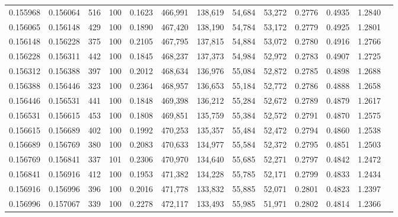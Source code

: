 \begin{tabular}{rrrrrrrrrrrrr}
0.155968 & 0.156064 &   516 & 100 &                                     0.1623 & 466,991 & 138,619 &  54,684 &  53,272 & 0.2776 & 0.4935 & 1.2840 \\
0.156065 & 0.156148 &   429 & 100 &                                     0.1890 & 467,420 & 138,190 &  54,784 &  53,172 & 0.2779 & 0.4925 & 1.2801 \\
0.156148 & 0.156228 &   375 & 100 &                                     0.2105 & 467,795 & 137,815 &  54,884 &  53,072 & 0.2780 & 0.4916 & 1.2766 \\
0.156228 & 0.156311 &   442 & 100 &                                     0.1845 & 468,237 & 137,373 &  54,984 &  52,972 & 0.2783 & 0.4907 & 1.2725 \\
0.156312 & 0.156388 &   397 & 100 &                                     0.2012 & 468,634 & 136,976 &  55,084 &  52,872 & 0.2785 & 0.4898 & 1.2688 \\
0.156388 & 0.156446 &   323 & 100 &                                     0.2364 & 468,957 & 136,653 &  55,184 &  52,772 & 0.2786 & 0.4888 & 1.2658 \\
0.156446 & 0.156531 &   441 & 100 &                                     0.1848 & 469,398 & 136,212 &  55,284 &  52,672 & 0.2789 & 0.4879 & 1.2617 \\
0.156531 & 0.156615 &   453 & 100 &                                     0.1808 & 469,851 & 135,759 &  55,384 &  52,572 & 0.2791 & 0.4870 & 1.2575 \\
0.156615 & 0.156689 &   402 & 100 &                                     0.1992 & 470,253 & 135,357 &  55,484 &  52,472 & 0.2794 & 0.4860 & 1.2538 \\
0.156689 & 0.156769 &   380 & 100 &                                     0.2083 & 470,633 & 134,977 &  55,584 &  52,372 & 0.2795 & 0.4851 & 1.2503 \\
0.156769 & 0.156841 &   337 & 101 &                                     0.2306 & 470,970 & 134,640 &  55,685 &  52,271 & 0.2797 & 0.4842 & 1.2472 \\
0.156841 & 0.156916 &   412 & 100 &                                     0.1953 & 471,382 & 134,228 &  55,785 &  52,171 & 0.2799 & 0.4833 & 1.2434 \\
0.156916 & 0.156996 &   396 & 100 &                                     0.2016 & 471,778 & 133,832 &  55,885 &  52,071 & 0.2801 & 0.4823 & 1.2397 \\
0.156996 & 0.157067 &   339 & 100 &                                     0.2278 & 472,117 & 133,493 &  55,985 &  51,971 & 0.2802 & 0.4814 & 1.2366 \\

\end{tabular}
